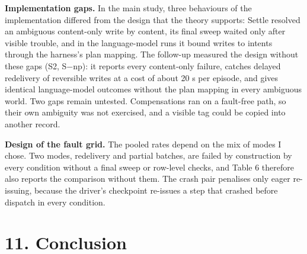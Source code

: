 \documentclass[
  10pt,
]{article}
\begin{document}
\textbf{Implementation gaps.} In the main study, three behaviours of the
implementation differed from the design that the theory supports: Settle
resolved an ambiguous content-only write by content, its final sweep
waited only after visible trouble, and in the language-model runs it
bound writes to intents through the harness's plan mapping. The
follow-up measured the design without these gaps (S2, S−np): it reports
every content-only failure, catches delayed redelivery of reversible
writes at a cost of about 20 s per episode, and gives identical
language-model outcomes without the plan mapping in every ambiguous
world. Two gaps remain untested. Compensations ran on a fault-free path,
so their own ambiguity was not exercised, and a visible tag could be
copied into another record.

\textbf{Design of the fault grid.} The pooled rates depend on the mix of
modes I chose. Two modes, redelivery and partial batches, are failed by
construction by every condition without a final sweep or row-level
checks, and Table 6 therefore also reports the comparison without them.
The crash pair penalises only eager re-issuing, because the driver's
checkpoint re-issues a step that crashed before dispatch in every
condition.

\hypertarget{conclusion}{%
\section*{11. Conclusion}\label{conclusion}}
\end{document}
